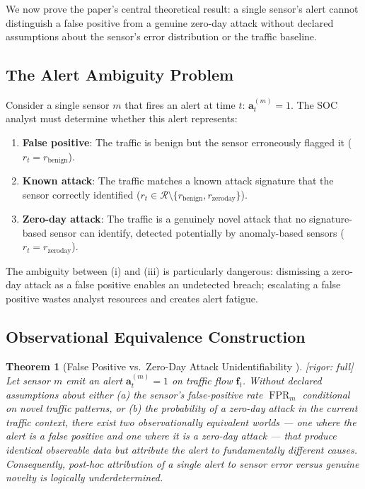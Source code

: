 \documentclass[11pt,a4paper]{article}
\newtheorem{theorem}{Theorem}[section]
\theoremstyle{definition}
\theoremstyle{remark}
\newcommand{\rigorFull}{\textcolor{green!60!black}{[rigor: full]}}
\DeclareMathOperator{\FPR}{FPR}
\newcommand{\alertvec}{\mathbf{a}}
\newcommand{\flowvec}{\mathbf{f}}
\begin{document}
We now prove the paper's central theoretical result: a single sensor's alert cannot distinguish a false positive from a genuine zero-day attack without declared assumptions about the sensor's error distribution or the traffic baseline.

\subsection{The Alert Ambiguity Problem }

Consider a single sensor $m$ that fires an alert at time $t$: $\alertvec_t^{(m)} = 1$. The SOC analyst must determine whether this alert represents:
\begin{enumerate}[label=(\roman*)]
    \item \textbf{False positive}: The traffic is benign but the sensor erroneously flagged it ($r_t = r_{\mathrm{benign}}$).
    \item \textbf{Known attack}: The traffic matches a known attack signature that the sensor correctly identified ($r_t \in \mathcal{R} \setminus \{r_{\mathrm{benign}}, r_{\mathrm{zeroday}}\}$).
    \item \textbf{Zero-day attack}: The traffic is a genuinely novel attack that no signature-based sensor can identify, detected potentially by anomaly-based sensors ($r_t = r_{\mathrm{zeroday}}$).
\end{enumerate}

The ambiguity between (i) and (iii) is particularly dangerous: dismissing a zero-day attack as a false positive enables an undetected breach; escalating a false positive wastes analyst resources and creates alert fatigue.

\subsection{Observational Equivalence Construction}

\begin{theorem}[False Positive vs.\ Zero-Day Attack Unidentifiability ]
\label{thm:fp_zeroday}
\rigorFull
Let sensor $m$ emit an alert $\alertvec_t^{(m)} = 1$ on traffic flow $\flowvec_t$. Without declared assumptions about either (a) the sensor's false-positive rate $\FPR_m$ conditional on novel traffic patterns, or (b) the probability of a zero-day attack in the current traffic context, there exist two observationally equivalent worlds — one where the alert is a false positive and one where it is a zero-day attack — that produce identical observable data but attribute the alert to fundamentally different causes. Consequently, post-hoc attribution of a single alert to sensor error versus genuine novelty is logically underdetermined.
\end{theorem}
\end{document}
